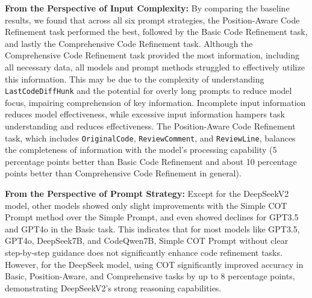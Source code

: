 \noindent
\textbf{From the Perspective of Input Complexity:} By comparing the baseline results, we found that across all six prompt strategies, the Position-Aware Code Refinement task performed the best, followed by the Basic Code Refinement task, and lastly the Comprehensive Code Refinement task. Although the Comprehensive Code Refinement task provided the most information, including all necessary data, all models and prompt methods struggled to effectively utilize this information. This may be due to the complexity of understanding \texttt{LastCodeDiffHunk} and the potential for overly long prompts to reduce model focus, impairing comprehension of key information. Incomplete input information reduces model effectiveness, while excessive input information hampers task understanding and reduces effectiveness. The Position-Aware Code Refinement task, which includes \texttt{OriginalCode}, \texttt{ReviewComment}, and \texttt{ReviewLine}, balances the completeness of information with the model's processing capability (5 percentage points better than Basic Code Refinement and about 10 percentage points better than Comprehensive Code Refinement in general). 


\noindent
\textbf{From the Perspective of Prompt Strategy:} 
Except for the DeepSeekV2 model, other models showed only slight improvements with the Simple COT Prompt method over the Simple Prompt, and even showed declines for GPT3.5 and GPT4o in the Basic task. This indicates that for most models like GPT3.5, GPT4o, DeepSeek7B, and CodeQwen7B, Simple COT Prompt without clear step-by-step guidance does not significantly enhance code refinement tasks. However, for the DeepSeek model, using COT significantly improved accuracy in Basic, Position-Aware, and Comprehensive tasks by up to 8 percentage points, demonstrating DeepSeekV2's strong reasoning capabilities. 

